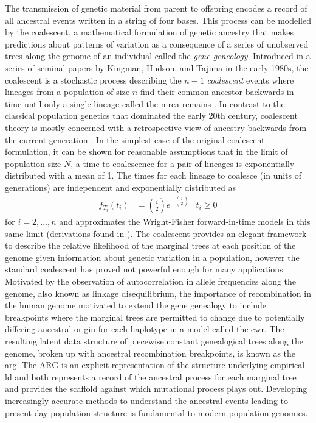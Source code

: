 The transmission of genetic material from parent to offspring encodes a record of all ancestral events written in a string of four bases. This process can be modelled by the coalescent, a mathematical formulation of genetic ancestry that makes predictions about patterns of variation as a consequence of a series of unobserved trees along the genome of an individual called the \textit{gene geneology}. Introduced in a series of seminal papers by Kingman, Hudson, and Tajima in the early 1980s, the coalescent is a stochastic process describing the $n-1$ \textit{coalescent} events where lineages from a population of size $n$ find their common ancestor backwards in time until only a single lineage called the \gls{mrca} remains \cite{Hudson1983,Kingman1982,Kingman1982a,F1983}. In contrast to the classical population genetics that dominated the early 20th century, coalescent theory is mostly concerned with a retrospective view of ancestry backwards from the current generation \cite{Ewens1990}. In the simplest case of the original coalescent formulation, it can be shown for reasonable assumptions that in the limit of population size $N$, a time to coalescence for a pair of lineages is exponentially distributed with a mean of 1. The times for each lineage to coalesce (in units of generations) are independent and exponentially distributed as $$ \begin{aligned} f_{T_i} (t_i) &=  \binom{i}{2}  e^{- \binom{i}{2}}  &t_i \geq 0 \end{aligned}$$ for $i = 2, \ldots, n$ and approximates the Wright-Fisher forward-in-time models in this same limit (derivations found in \textcite[Chapter 3.2]{Wakeley2009a}). The coalescent provides an elegant framework to describe the relative likelihood of the marginal trees at each position of the genome given information about genetic variation in a population, however the standard coalescent has proved not powerful enough for many applications. Motivated by the observation of autocorrelation in allele frequencies along the genome, also known as linkage disequilibrium, the importance of recombination in the human genome motivated \textcite{Griffiths1997a} to extend the gene genealogy to include breakpoints where the marginal trees are permitted to change due to potentially differing ancestral origin for each haplotype in a model called the \gls{cwr}. The resulting latent data structure of piecewise constant genealogical trees along the genome, broken up with ancestral recombination breakpoints, is known as the \gls{arg}. The ARG is an explicit representation of the structure underlying empirical \gls{ld} and both represents a record of the ancestral process for each marginal tree and provides the scaffold against which mutational process plays out. Developing increasingly accurate methods to understand the ancestral events leading to present day population structure is fundamental to modern population genomics.  


